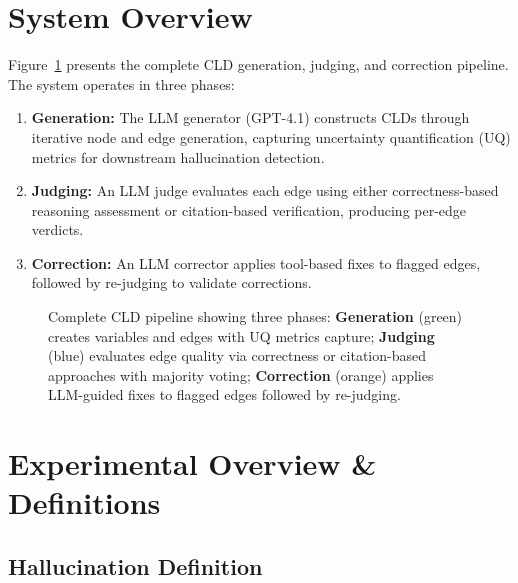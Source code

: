 \section{System Overview}

\label{sec:methods_system_overview}

Figure~\ref{fig:cld_pipeline} presents the complete CLD generation, judging, and correction pipeline. The system operates in three phases:

\begin{enumerate}[noitemsep]
    \item \textbf{Generation:} The LLM generator (GPT-4.1) constructs CLDs through iterative node and edge generation, capturing uncertainty quantification (UQ) metrics for downstream hallucination detection.
    \item \textbf{Judging:} An LLM judge evaluates each edge using either correctness-based reasoning assessment or citation-based verification, producing per-edge verdicts.
    \item \textbf{Correction:} An LLM corrector applies tool-based fixes to flagged edges, followed by re-judging to validate corrections.
\end{enumerate}

\begin{figure}[H]
\centering
\resizebox{\textwidth}{!}{%

}
\caption{Complete CLD pipeline showing three phases: \textbf{Generation} (green) creates variables and edges with UQ metrics capture; \textbf{Judging} (blue) evaluates edge quality via correctness or citation-based approaches with majority voting; \textbf{Correction} (orange) applies LLM-guided fixes to flagged edges followed by re-judging.}
\label{fig:cld_pipeline}
\end{figure}

\section{Experimental Overview \& Definitions}

\subsection{Hallucination Definition}
\label{sec:hallucination_definition}

